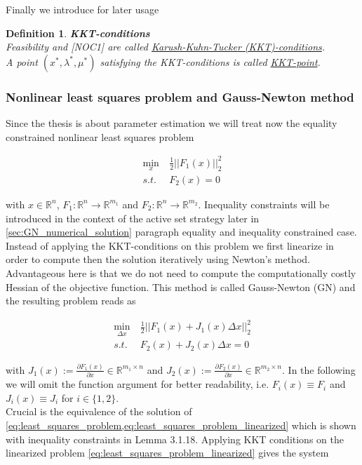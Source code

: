 \documentclass{scrartcl}[12pt, halfparskip]
\numberwithin{equation}{section}
\numberwithin{figure}{section}
\numberwithin{table}{section}
\newtheorem{Definition}{Definition}
\begin{document}
Finally we introduce for later usage 

\begin{Definition} \textbf{KKT-conditions} \\
	Feasibility and [NOC1] are called \underline{Karush-Kuhn-Tucker (KKT)-conditions}. \\
	A point $(x^*, \lambda^*, \mu^*)$ satisfying the KKT-conditions is called \underline{KKT-point}.
\end{Definition}


\subsubsection{Nonlinear least squares problem and Gauss-Newton method}
\label{sec:Gauss_Newton}
Since the thesis is about parameter estimation we will treat now the equality constrained nonlinear least squares problem

\begin{align}
	\min_x \ & \frac{1}{2}|| F_1(x) ||_2^2 \label{eq:least_squares_problem} \\
	s.t. \ & F_2(x) = 0 \nonumber
\end{align}

with $x \in \mathbb{R}^n$, $F_1: \mathbb{R}^n \rightarrow \mathbb{R}^{m_1}$ and $F_2: \mathbb{R}^n \rightarrow \mathbb{R}^{m_2}$. Inequality constraints will be introduced in the context of the active set strategy later in \cref{sec:GN_numerical_solution} paragraph equality and inequality constrained case. \\
Instead of applying the KKT-conditions on this problem we first linearize in order to compute then the solution iteratively using Newton's method. Advantageous here is that we do not need to compute the computationally costly Hessian of the objective function. This method is called Gauss-Newton (GN) and the resulting problem reads as

\begin{align}
\min_{\Delta x} \ & \frac{1}{2}|| F_1(x) + J_1(x) \Delta x ||_2^2 \label{eq:least_squares_problem_linearized} \\
s.t. \ & F_2(x) + J_2(x) \Delta x = 0 \nonumber
\end{align}

with $J_1(x) := \frac{\partial F_1(x)}{\partial x} \in \mathbb{R}^{m_1 \times n}$ and $J_2(x) := \frac{\partial F_2(x)}{\partial x} \in \mathbb{R}^{m_2 \times n}$. In the following we will omit the function argument for better readability, i.e. $F_i(x) \equiv F_i$ and $J_i(x) \equiv J_i$ for $i \in \{1,2\}$. \\
Crucial is the equivalence of the solution of \cref{eq:least_squares_problem,eq:least_squares_problem_linearized} which is shown with inequality constraints in \cite{diss_bock} Lemma 3.1.18.
Applying KKT conditions on the linearized problem \cref{eq:least_squares_problem_linearized} gives the system
\end{document}
